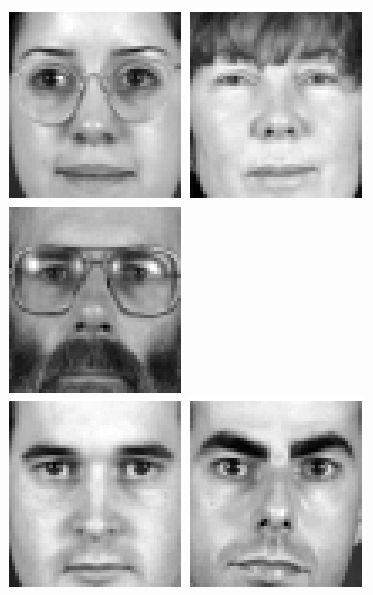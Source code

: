 \begin{figure}[ht]
\begin{center}
\includegraphics[scale=0.12]{ch4/figures/XM2VTS_6.png}
\includegraphics[scale=0.12]{ch4/figures/XM2VTS_7.png}
\includegraphics[scale=0.12]{ch4/figures/XM2VTS_8.png}\\
\includegraphics[scale=0.12]{ch4/figures/XM2VTS_9.png}
\includegraphics[scale=0.12]{ch4/figures/XM2VTS_10.png}

\end{center}
\end{figure}
